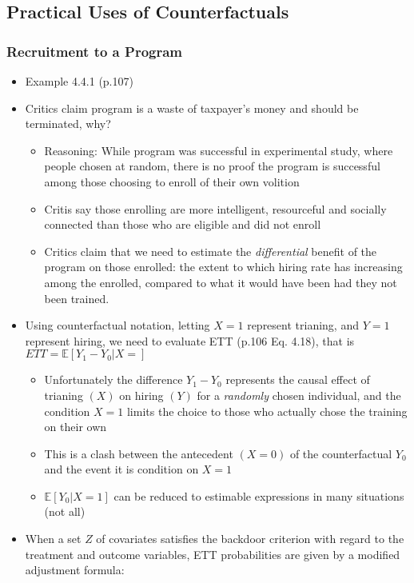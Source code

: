 \documentclass[]{article}
\providecommand{\tightlist}{%
  \setlength{\itemsep}{0pt}\setlength{\parskip}{0pt}}
\begin{document}
\subsection{Practical Uses of
Counterfactuals}\label{practical-uses-of-counterfactuals}

\subsubsection{Recruitment to a Program}\label{recruitment-to-a-program}

\begin{itemize}
\item
  Example 4.4.1 (p.107)
\item
  Critics claim program is a waste of taxpayer's money and should be
  terminated, why?

  \begin{itemize}
  \tightlist
  \item
    Reasoning: While program was successful in experimental study, where
    people chosen at random, there is no proof the program is successful
    among those choosing to enroll of their own volition
  \item
    Critis say those enrolling are more intelligent, resourceful and
    socially connected than those who are eligible and did not enroll
  \item
    Critics claim that we need to estimate the \emph{differential}
    benefit of the program on those enrolled: the extent to which hiring
    rate has increasing among the enrolled, compared to what it would
    have been had they not been trained.
  \end{itemize}
\item
  Using counterfactual notation, letting \(X = 1\) represent trianing,
  and \(Y = 1\) represent hiring, we need to evaluate ETT (p.106 Eq.
  4.18), that is \(ETT = \mathbb{E}[Y_1 - Y_0|X = ]\)

  \begin{itemize}
  \tightlist
  \item
    Unfortunately the difference \(Y_1 - Y_0\) represents the causal
    effect of trianing \((X)\) on hiring \((Y)\) for a \emph{randomly}
    chosen individual, and the condition \(X = 1\) limits the choice to
    those who actually chose the training on their own
  \item
    This is a clash between the antecedent \((X = 0)\) of the
    counterfactual \(Y_0\) and the event it is condition on \(X = 1\)
  \item
    \(\mathbb{E}[Y_0 | X = 1]\) can be reduced to estimable expressions
    in many situations (not all)
  \end{itemize}
\item
  When a set \(Z\) of covariates satisfies the backdoor criterion with
  regard to the treatment and outcome variables, ETT probabilities are
  given by a modified adjustment formula:


\end{itemize}
\end{document}

